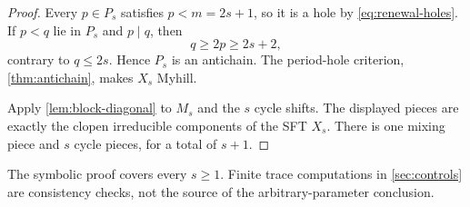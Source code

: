 \begin{proof}
Every $p\in P_s$ satisfies $p<m=2s+1$, so it is a hole by
\eqref{eq:renewal-holes}.  If $p<q$ lie in $P_s$ and $p\mid q$, then
\[
 q\geq2p\geq2s+2,
\]
contrary to $q\leq2s$.  Hence $P_s$ is an antichain.  The
period-hole criterion, \cref{thm:antichain}, makes $X_s$ Myhill.

Apply \cref{lem:block-diagonal} to $M_s$ and the $s$ cycle shifts.  The
displayed pieces are exactly the clopen irreducible components of the SFT
$X_s$.  There is one mixing piece and $s$ cycle pieces, for a total of $s+1$.
\end{proof}

\begin{remark}
The symbolic proof covers every $s\geq1$.  Finite trace computations in
\cref{sec:controls} are consistency checks, not the source of the
arbitrary-parameter conclusion.
\end{remark}
